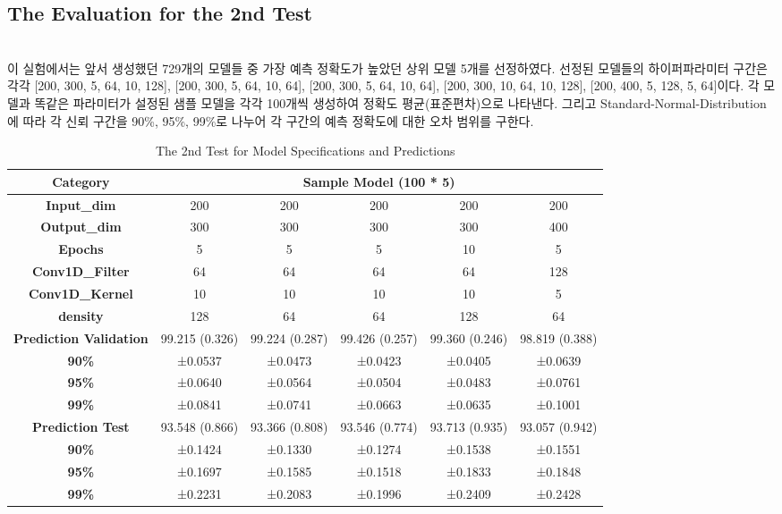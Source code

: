 \documentclass{jcse}
\begin{document}
\subsection{The Evaluation for the 2nd Test}
\\이 실험에서는 앞서 생성했던 729개의 모델들 중 가장 예측 정확도가 높았던 상위 모델 5개를 선정하였다. 선정된 모델들의 하이퍼파라미터 구간은 각각 [200, 300, 5, 64, 10, 128], [200, 300, 5, 64, 10, 64], [200, 300, 5, 64, 10, 64], [200, 300, 10, 64, 10, 128], [200, 400, 5, 128, 5, 64]이다. 각 모델과 똑같은 파라미터가 설정된 샘플 모델을 각각 100개씩 생성하여 정확도 평균(표준편차)으로 나타낸다. 그리고 Standard-Normal-Distribution에 따라 각 신뢰 구간을 90\%, 95\%, 99\%로 나누어 각 구간의 예측 정확도에 대한 오차 범위를 구한다.
\\
\begin{table*}
\label{fig:Rank 5 Models - Table}
\centering
\caption{The 2nd Test for Model Specifications and Predictions}
\begin{tabular}{|c|c|c|c|c|c|}
\hline
\textbf{Category} & \multicolumn{5}{c|}{\textbf{Sample Model (100 * 5)}} \\
\hline
\textbf{Input\_dim} & 200 & 200 & 200 & 200 & 200 \\
\hline
\textbf{Output\_dim} & 300 & 300 & 300 & 300 & 400 \\
\hline
\textbf{Epochs} & 5 & 5 & 5 & 10 & 5 \\
\hline
\textbf{Conv1D\_Filter} & 64 & 64 & 64 & 64 & 128 \\
\hline
\textbf{Conv1D\_Kernel} & 10 & 10 & 10 & 10 & 5 \\
\hline
\textbf{density} & 128 & 64 & 64 & 128 & 64 \\
\hline
\textbf{Prediction Validation} & 99.215 (0.326) & 99.224 (0.287) & 99.426 (0.257) & 99.360 (0.246) & 98.819 (0.388) \\
\hline
\textbf{90\%} & ±0.0537 & ±0.0473 & ±0.0423 & ±0.0405 & ±0.0639 \\
\hline
\textbf{95\%} & ±0.0640 & ±0.0564 & ±0.0504 & ±0.0483 & ±0.0761 \\
\hline
\textbf{99\%} & ±0.0841 & ±0.0741 & ±0.0663 & ±0.0635 & ±0.1001 \\
\hline
\textbf{Prediction Test} & 93.548 (0.866) & 93.366 (0.808) & 93.546 (0.774) & 93.713 (0.935) & 93.057 (0.942) \\
\hline
\textbf{90\%} & ±0.1424 & ±0.1330 & ±0.1274 & ±0.1538 & ±0.1551 \\
\hline
\textbf{95\%} & ±0.1697 & ±0.1585 & ±0.1518 & ±0.1833 & ±0.1848 \\
\hline
\textbf{99\%} & ±0.2231 & ±0.2083 & ±0.1996 & ±0.2409 & ±0.2428 \\
\hline
\end{tabular}
\end{table*}
\end{document}
